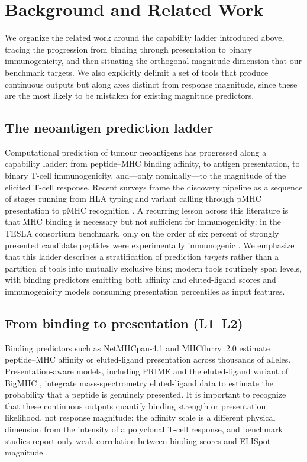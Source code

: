 \section{Background and Related Work}
\label{sec:related}

We organize the related work around the capability ladder introduced above,
tracing the progression from binding through presentation to binary
immunogenicity, and then situating the orthogonal magnitude dimension that our
benchmark targets. We also explicitly delimit a set of tools that produce
continuous outputs but along axes distinct from response magnitude, since these
are the most likely to be mistaken for existing magnitude predictors.

\subsection{The neoantigen prediction ladder}
\label{sec:related:ladder}

Computational prediction of tumour neoantigens has progressed along a capability
ladder: from peptide--MHC binding affinity, to antigen presentation, to binary
T-cell immunogenicity, and---only nominally---to the magnitude of the elicited
T-cell response. Recent surveys frame the discovery pipeline as a sequence of
stages running from HLA typing and variant calling through pMHC presentation to
pMHC recognition \cite{Zhao2025,BiomarkerRes2025}. A recurring lesson across this
literature is that MHC binding is necessary but not sufficient for
immunogenicity: in the TESLA consortium benchmark, only on the order of six
percent of strongly presented candidate peptides were experimentally
immunogenic \cite{TESLA2020}. We emphasize that this ladder describes a
stratification of prediction \emph{targets} rather than a partition of tools into
mutually exclusive bins; modern tools routinely span levels, with binding
predictors emitting both affinity and eluted-ligand scores and immunogenicity
models consuming presentation percentiles as input features.

\subsection{From binding to presentation (L1--L2)}
\label{sec:related:binding}

Binding predictors such as NetMHCpan-4.1 \cite{NetMHCpan2020} and MHCflurry~2.0
\cite{MHCflurry2020} estimate peptide--MHC affinity or eluted-ligand presentation
across thousands of alleles. Presentation-aware models, including PRIME
\cite{PRIME2023} and the eluted-ligand variant of BigMHC \cite{BigMHC2023},
integrate mass-spectrometry eluted-ligand data to estimate the probability that a
peptide is genuinely presented. It is important to recognize that these
continuous outputs quantify binding strength or presentation likelihood, not
response magnitude: the affinity scale is a different physical dimension from the
intensity of a polyclonal T-cell response, and benchmark studies report only weak
correlation between binding scores and ELISpot magnitude
\cite{explorationpub2023,Buckley2022}.

